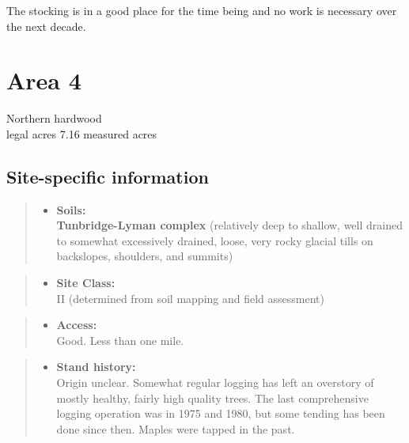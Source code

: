 \documentclass[]{tufte-handout}
\providecommand{\tightlist}{%
  \setlength{\itemsep}{0pt}\setlength{\parskip}{0pt}}
\begin{document}
The stocking is in a good place for the time being and no work is
necessary over the next decade.

\newpage

\section{Area 4}\label{area-4}

Northern hardwood\\
 legal acres \textbar{} 7.16 measured acres

\subsection{Site-specific
information}\label{site-specific-information-3}

\begin{quote}
\begin{itemize}
\tightlist
\item
  \textbf{Soils:}\\
  \indent\indent  \textbf{Tunbridge-Lyman complex} (relatively deep to
  shallow, well drained to somewhat excessively drained, loose, very
  rocky glacial tills on backslopes, shoulders, and summits)
\end{itemize}
\end{quote}

\begin{quote}
\begin{itemize}
\tightlist
\item
  \textbf{Site Class:}\\
  \vspace{2pt} II (determined from soil mapping and field assessment)
\end{itemize}
\end{quote}

\begin{quote}
\begin{itemize}
\tightlist
\item
  \textbf{Access:}\\
  \vspace{2pt} Good. Less than one mile.
\end{itemize}
\end{quote}

\begin{quote}
\begin{itemize}
\tightlist
\item
  \textbf{Stand history:}\\
  \vspace{2pt} Origin unclear. Somewhat regular logging has left an
  overstory of mostly healthy, fairly high quality trees. The last
  comprehensive logging operation was in 1975 and 1980, but some tending
  has been done since then. Maples were tapped in the past.
\end{itemize}
\end{quote}
\end{document}
